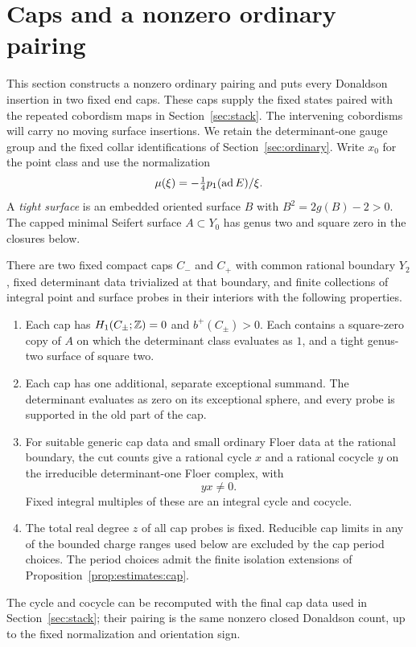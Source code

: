 \section{Caps and a nonzero ordinary pairing}\label{sec:caps}

This section constructs a nonzero ordinary pairing and puts every
Donaldson insertion in two fixed end caps.  These caps supply the fixed
states paired with the repeated cobordism maps in Section~\ref{sec:stack}.
The intervening cobordisms will carry no moving surface insertions.
We retain the determinant-one gauge group and the fixed collar
identifications of Section~\ref{sec:ordinary}.  Write $x_0$ for the point
class and use the normalization
\begin{equation}\label{eq:caps:normalization}
 \mu(\xi)=-\tfrac14 p_1(\operatorname{ad} E)/\xi .
\end{equation}
A \emph{tight surface} is an embedded oriented surface $B$ with
$B^2=2g(B)-2>0$.  The capped minimal Seifert surface $A\subset Y_0$ has
genus two and square zero in the closures below.

\begin{theorem}\label{thm:caps:pairing}
There are two fixed compact caps $C_-$ and $C_+$ with common rational
boundary $Y_2$, fixed determinant data trivialized at that boundary, and
finite collections of integral point and surface probes in their interiors
with the following properties.
\begin{enumerate}[label=\textup{(\roman*)}]
\item Each cap has $H_1(C_\pm;\mathbb Z)=0$ and $b^+(C_\pm)>0$.  Each contains
a square-zero copy of $A$ on which the determinant class evaluates as $1$,
and a tight genus-two surface of square two.
\item Each cap has one additional, separate exceptional summand.  The
determinant evaluates as zero on its exceptional sphere, and every probe
is supported in the old part of the cap.
\item For suitable generic cap data and small ordinary Floer data at the
rational boundary, the cut counts give a rational cycle $x$ and a rational
cocycle $y$ on the irreducible determinant-one Floer complex, with
\begin{equation}\label{eq:caps:nonzero-pairing}
                         yx\ne0.
\end{equation}
Fixed integral multiples of these are an integral cycle and cocycle.
\item The total real degree $z$ of all cap probes is fixed.  Reducible
cap limits in any of the bounded charge ranges used below are excluded by
the cap period choices.  The period choices admit the finite isolation
extensions of Proposition~\ref{prop:estimates:cap}.
\end{enumerate}
The cycle and cocycle can be recomputed with the final cap data used in
Section~\ref{sec:stack}; their pairing is the same nonzero closed
Donaldson count, up to the fixed normalization and orientation sign.
\end{theorem}


